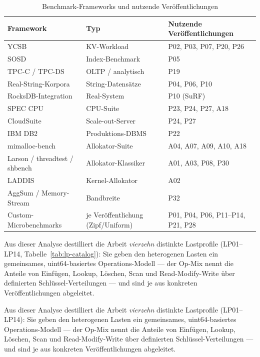 \begin{nurlang}
\begin{table}[!htbp]
  \caption{Benchmark-Frameworks und nutzende Veröffentlichungen}\label{tab:wl-frameworks}
  \centering\footnotesize
  \begin{tabular}{@{}p{3.2cm} p{2.8cm} p{6cm}@{}}
    \toprule
    \textbf{Framework} & \textbf{Typ} & \textbf{Nutzende Veröffentlichungen} \\
    \midrule
    YCSB~\cite{cooper2010ycsb} & KV-Workload & P02, P03, P07, P20, P26 \\
    SOSD~\cite{kipf2019sosd} & Index-Benchmark & P05 \\
    TPC-C / TPC-DS~\cite{tpc_benchmarks} & OLTP / analytisch & P19 \\
    Real-String-Korpora & String-Datensätze & P04, P06, P10 \\
    RocksDB-Integration & Real-System & P10 (SuRF) \\
    SPEC CPU~\cite{spec_cpu2017} & CPU-Suite & P23, P24, P27, A18 \\
    CloudSuite~\cite{ferdman2012cloudsuite} & Scale-out-Server & P24, P27 \\
    IBM DB2 & Produktions-DBMS & P22 \\
    mimalloc-bench~\cite{mimalloc_bench} & Allokator-Suite & A04, A07, A09, A10, A18 \\
    Larson / threadtest / shbench & Allokator-Klassiker & A01, A03, P08, P30 \\
    LADDIS & Kernel-Allokator & A02 \\
    AggSum / Memory-Stream & Bandbreite & P32 \\
    Custom-Microbenchmarks & je Veröffentlichung (Zipf/Uniform) & P01, P04, P06, P11--P14, P21, P28 \\
    \bottomrule
  \end{tabular}
\end{table}
\end{nurlang}

\begin{nurlang}
Aus dieser Analyse destilliert die Arbeit \emph{vierzehn} distinkte Lastprofile (LP01--LP14,
Tabelle~\ref{tab:lp-catalog}): Sie geben den heterogenen Lasten ein gemeinsames, uint64-basiertes
Operations-Modell --- der Op-Mix nennt die Anteile von Einfügen, Lookup, Löschen, Scan und
Read-Modify-Write über definierten Schlüssel-Verteilungen --- und sind je aus konkreten Veröffentlichungen
abgeleitet.
\end{nurlang}
\begin{nurkurz}
Aus dieser Analyse destilliert die Arbeit \emph{vierzehn} distinkte Lastprofile (LP01--LP14): Sie geben den
heterogenen Lasten ein gemeinsames, uint64-basiertes
Operations-Modell --- der Op-Mix nennt die Anteile von Einfügen, Lookup, Löschen, Scan und
Read-Modify-Write über definierten Schlüssel-Verteilungen --- und sind je aus konkreten Veröffentlichungen
abgeleitet.
\end{nurkurz}

